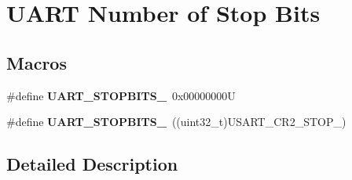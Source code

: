 \hypertarget{group___u_a_r_t___stop___bits}{}\section{U\+A\+RT Number of Stop Bits}
\label{group___u_a_r_t___stop___bits}
\subsection*{Macros}
\begin{DoxyCompactItemize}
\item 
\mbox{\label{group___u_a_r_t___stop___bits_ga7cf97e555292d574de8abc596ba0e2ce}} 
\#define {\bfseries U\+A\+R\+T\+\_\+\+S\+T\+O\+P\+B\+I\+T\+S\+\_}~0x00000000U
\item 
\mbox{\label{group___u_a_r_t___stop___bits_ga91616523380f7450aac6cb7e17f0c0f2}} 
\#define {\bfseries U\+A\+R\+T\+\_\+\+S\+T\+O\+P\+B\+I\+T\+S\+\_}~((uint32\+\_\+t)U\+S\+A\+R\+T\+\_\+\+C\+R2\+\_\+\+S\+T\+O\+P\+\_)
\end{DoxyCompactItemize}


\subsection{Detailed Description}
